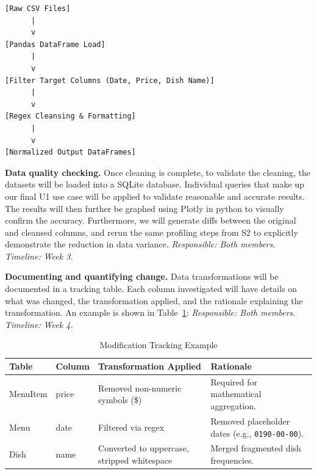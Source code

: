 \documentclass[11pt]{article}
\begin{document}
\begin{description}
\begin{verbatim}
[Raw CSV Files] 
      |
      v
[Pandas DataFrame Load]
      |
      v
[Filter Target Columns (Date, Price, Dish Name)]
      |
      v
[Regex Cleansing & Formatting]
      |
      v
[Normalized Output DataFrames]
\end{verbatim}
    
    \item[S4] \textbf{Data quality checking.} Once cleaning is complete, to
    validate the cleaning, the datasets will be loaded into a SQLite database.
    Individual queries that make up our final U1 use case will be applied to
    validate reasonable and accurate results. The results will then further be
    graphed using Plotly in python to visually confirm the accuracy. Furthermore,
    we will generate diffs between the original and cleansed columns, and rerun
    the same profiling steps from S2 to explicitly demonstrate the reduction in
    data variance.
    \textit{Responsible: Both members. Timeline: Week 3.}
    
    \item[S5] \textbf{Documenting and quantifying change.} Data transformations
    will be documented in a tracking table. Each column investigated will have
    details on what was changed, the transformation applied, and the rationale
    explaining the transformation. An example is shown in Table~\ref{tab:mod_tracking}:
    \textit{Responsible: Both members. Timeline: Week 4.}

\begin{table}[htbp]
    \centering
    \begin{tabular}{|l|l|l|p{6cm}|}
    \hline
    \textbf{Table} & \textbf{Column} & \textbf{Transformation Applied} & \textbf{Rationale} \\
    \hline
    MenuItem & price & Removed non-numeric symbols (\$) & Required for mathematical aggregation. \\
    Menu & date & Filtered via regex & Removed placeholder dates (e.g., \texttt{0190-00-00}). \\
    Dish & name & Converted to uppercase, stripped whitespace & Merged fragmented dish frequencies. \\
    \hline
    \end{tabular}
    \caption{Modification Tracking Example}
    \label{tab:mod_tracking}
\end{table}

\end{description}
\end{document}

